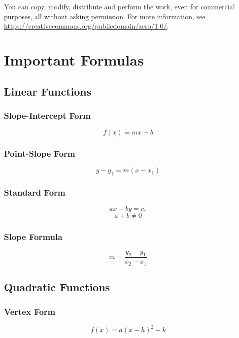 \documentclass[12pt]{book}
\begin{document}
You can copy, modify, distribute and perform the work, even for commercial purposes, all without asking permission. For more information, see \url{https://creativecommons.org/publicdomain/zero/1.0/}.

\tableofcontents %

\newpage

\chapter{Important Formulas} %
\section{Linear Functions}
\subsection{Slope-Intercept Form}
\begin{equation} 
    f(x) = mx + b
\end{equation}

\subsection{Point-Slope Form}
\begin{equation}
    y-y_1 = m(x - x_1)
\end{equation}
\subsection{Standard Form}
\begin{equation}
    ax+by = c,
\end{equation}
\begin{equation}
    a+b \neq 0 
\end{equation}
\subsection{Slope Formula}
\begin{equation}
    m = \frac{y_2 - y_1}{x_2 - x_1}
\end{equation}

\section{Quadratic Functions}
\subsection{Vertex Form}
\begin{equation}
    f(x) = a(x-h)^2 + k
\end{equation}
\end{document}

